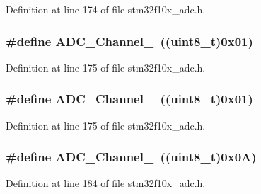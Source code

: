 Definition at line 174 of file stm32f10x\+\_\+adc.\+h.

\subsubsection[{\texorpdfstring{A\+D\+C\+\_\+\+Channel\+\_\+1}{ADC_Channel_1}}]{\setlength{\rightskip}{0pt plus 5cm}\#define A\+D\+C\+\_\+\+Channel\+\_~(({\bf uint8\+\_\+t})0x01)}\hypertarget{group___a_d_c__channels_ga0b04cebf8d62085eca6dc7daa3d5d3f0}{}\label{group___a_d_c__channels_ga0b04cebf8d62085eca6dc7daa3d5d3f0}


Definition at line 175 of file stm32f10x\+\_\+adc.\+h.

\subsubsection[{\texorpdfstring{A\+D\+C\+\_\+\+Channel\+\_\+1}{ADC_Channel_1}}]{\setlength{\rightskip}{0pt plus 5cm}\#define A\+D\+C\+\_\+\+Channel\+\_~(({\bf uint8\+\_\+t})0x01)}\hypertarget{group___a_d_c__channels_ga0b04cebf8d62085eca6dc7daa3d5d3f0}{}\label{group___a_d_c__channels_ga0b04cebf8d62085eca6dc7daa3d5d3f0}


Definition at line 175 of file stm32f10x\+\_\+adc.\+h.

\subsubsection[{\texorpdfstring{A\+D\+C\+\_\+\+Channel\+\_\+10}{ADC_Channel_10}}]{\setlength{\rightskip}{0pt plus 5cm}\#define A\+D\+C\+\_\+\+Channel\+\_~(({\bf uint8\+\_\+t})0x0\+A)}\hypertarget{group___a_d_c__channels_gabfa98b580f49a82a83dcb1df32efceca}{}\label{group___a_d_c__channels_gabfa98b580f49a82a83dcb1df32efceca}


Definition at line 184 of file stm32f10x\+\_\+adc.\+h.

